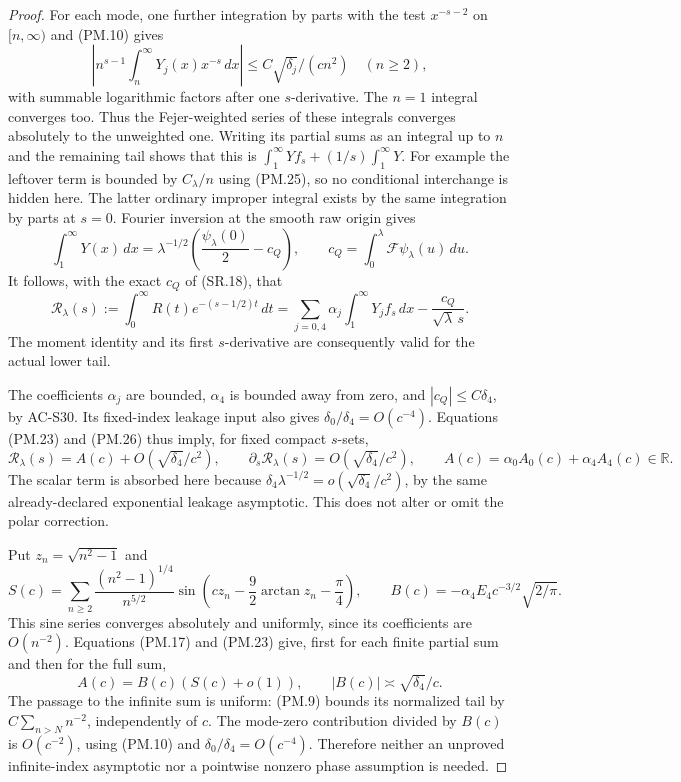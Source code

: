 \begin{proof}
For each mode, one further integration by parts with the test
\(x^{-s-2}\) on \([n,\infty)\) and (PM.10) gives
\[
 \left|n^{s-1}\int_n^\infty Y_j(x)x^{-s}\,dx\right|
                 \le C\sqrt{\delta_j}/(c n^2)\quad(n\ge2),
 \tag{PM.25}
\]
with summable logarithmic factors after one \(s\)-derivative.
The \(n=1\) integral converges too.  Thus the Fejer-weighted series
of these integrals converges absolutely to the unweighted one.
Writing its partial sums as an integral up to \(n\) and the remaining
tail shows that this is
\(\int_1^\infty Yf_s+(1/s)\int_1^\infty Y\).
For example the leftover term is bounded by \(C_\lambda/n\) using
(PM.25), so no conditional interchange is hidden here.
The latter ordinary improper integral exists by the same integration
by parts at \(s=0\).  Fourier inversion at the smooth raw origin gives
\[
 \int_1^\infty Y(x)\,dx
   =\lambda^{-1/2}\left(\frac{\psi_\lambda(0)}2-c_Q\right),
 \qquad c_Q=\int_0^\lambda\mathcal F\psi_\lambda(u)\,du.
\]
It follows, with the exact \(c_Q\) of (SR.18), that
\[
 \mathcal R_\lambda(s):=\int_0^\infty
           R(t)e^{-(s-1/2)t}\,dt
 =\sum_{j=0,4}\alpha_j\int_1^\infty Y_jf_s\,dx
                       -\frac{c_Q}{\sqrt\lambda\,s}.
 \tag{PM.26}
\]
The moment identity and its first \(s\)-derivative are consequently
valid for the actual lower tail.

The coefficients \(\alpha_j\) are bounded, \(\alpha_4\) is bounded
away from zero, and \(|c_Q|\le C\delta_4\), by AC-S30.  Its fixed-index
leakage input also gives \(\delta_0/\delta_4=O(c^{-4})\).
Equations (PM.23) and (PM.26) thus imply, for fixed compact \(s\)-sets,
\[
 \mathcal R_\lambda(s)=A(c)+O(\sqrt{\delta_4}/c^2),\qquad
 \partial_s\mathcal R_\lambda(s)=O(\sqrt{\delta_4}/c^2),\qquad
 A(c)=\alpha_0A_0(c)+\alpha_4A_4(c)\in\mathbb R.
 \tag{PM.27}
\]
The scalar term is absorbed here because
\(\delta_4\lambda^{-1/2}=o(\sqrt{\delta_4}/c^2)\), by the same
already-declared exponential leakage asymptotic.  This does not alter
or omit the polar correction.

Put \(z_n=\sqrt{n^2-1}\) and
\[
 S(c)=\sum_{n\ge2}\frac{(n^2-1)^{1/4}}{n^{5/2}}
       \sin\left(cz_n-\frac92\arctan z_n-\frac\pi4\right),
 \qquad
 B(c)=-\alpha_4 E_4 c^{-3/2}\sqrt{2/\pi}.
 \tag{PM.28}
\]
This sine series converges absolutely and uniformly, since its
coefficients are \(O(n^{-2})\).  Equations (PM.17) and (PM.23)
give, first for each finite partial sum and then for the full sum,
\[
                  A(c)=B(c)(S(c)+o(1)),
 \qquad |B(c)|\asymp\sqrt{\delta_4}/c.
 \tag{PM.29}
\]
The passage to the infinite sum is uniform: (PM.9) bounds its normalized
tail by \(C\sum_{n>N}n^{-2}\), independently of \(c\).  The mode-zero
contribution divided by \(B(c)\) is \(O(c^{-2})\), using (PM.10) and
\(\delta_0/\delta_4=O(c^{-4})\).  Therefore neither an unproved
infinite-index asymptotic nor a pointwise nonzero phase assumption is
needed.


\end{proof}
